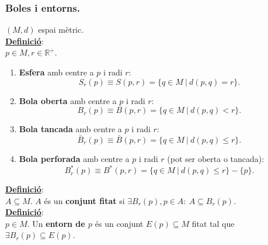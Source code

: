 \documentclass[11pt]{article}
\newcommand{\defi}{\underline{\textbf{Definició}}:\\}
\begin{document}
\subsubsection{Boles i entorns.}
$(M,d)$ espai mètric.\\
\defi $p\in M,r\in\mathbb{R}^+$.
\begin{enumerate}
	\item \textbf{Esfera} amb centre a $p$ i radi $r$:
	$$
	S_r(p)\equiv S(p,r)=\{q\in M\ \vert\ d(p,q)=r\}.
	$$
	\item \textbf{Bola oberta} amb centre a $p$ i radi $r$:
	$$
	B_r(p)\equiv B(p,r)=\{q\in M\ \vert\ d(p,q)<r\}.
	$$
	\item \textbf{Bola tancada} amb centre a $p$ i radi $r$:
	$$
	\bar{B}_r(p)\equiv\bar{B}(p,r)=\{q\in M\ \vert\ d(p,q)\leq r\}.
	$$
	\item \textbf{Bola perforada} amb centre a $p$ i radi $r$ (pot ser oberta o tancada):
	$$
	B^*_r(p)\equiv B^*(p,r)=\{q\in M\ \vert\ d(p,q)\leq r\}-\{p\}.
	$$
\end{enumerate}
\defi $A\subseteq M$. $A$ és un \textbf{conjunt fitat} si $\exists B_r(p),p\in A:\ A\subseteq B_r(p)$.\\
\defi $p\in M$. Un \textbf{entorn de $p$} és un conjunt $E(p)\subseteq M$ fitat tal que $\exists B_r(p)\subseteq E(p)$.
\newpage

\newpage
\end{document}
